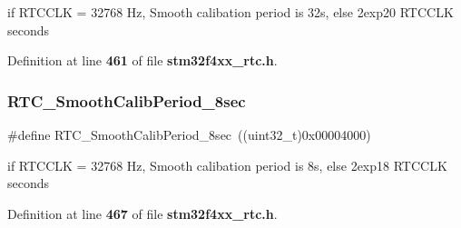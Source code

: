 if R\+T\+C\+C\+LK = 32768 Hz, Smooth calibation period is 32s, else 2exp20 R\+T\+C\+C\+LK seconds 

Definition at line \textbf{ 461} of file \textbf{ stm32f4xx\+\_\+rtc.\+h}.

\mbox{\label{group__RTC__Smooth__calib__period__Definitions_ga8a34f8b7e145649bad2ec36b69eccbd3}} 
\subsubsection{R\+T\+C\+\_\+\+Smooth\+Calib\+Period\+\_\+8sec}
{\footnotesize\ttfamily \#define R\+T\+C\+\_\+\+Smooth\+Calib\+Period\+\_\+8sec~((uint32\+\_\+t)0x00004000)}

if R\+T\+C\+C\+LK = 32768 Hz, Smooth calibation period is 8s, else 2exp18 R\+T\+C\+C\+LK seconds 

Definition at line \textbf{ 467} of file \textbf{ stm32f4xx\+\_\+rtc.\+h}.

